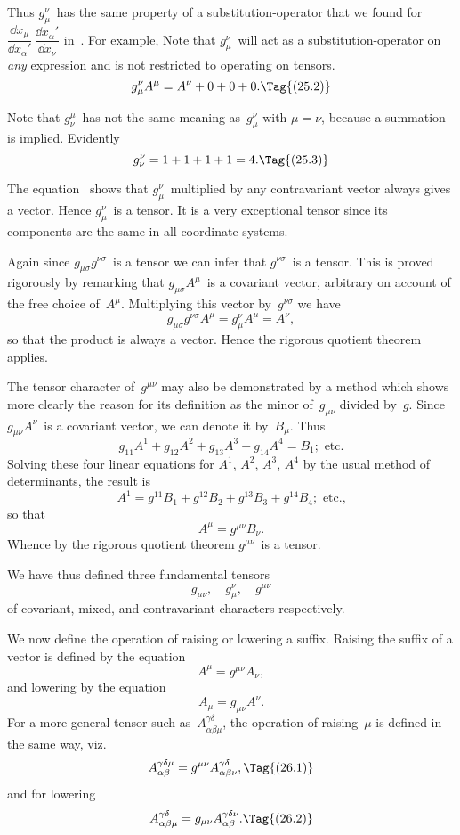 \documentclass[12pt]{book}
\begin{document}
Thus $g_{\mu}^{\nu}$~has the same property of a substitution-operator that we found
%
for $\dfrac{\dd x_{\mu}}{\dd x_{\alpha}'}\, \dfrac{\dd x_{\alpha}'}{\dd x_{\nu}}$ in~. For example\footnotemark,\footnotetext
  {Note that $g_{\mu}^{\nu}$~will act as a substitution-operator on \emph{any} expression and is not restricted to
  operating on tensors.}
\[
g_{\mu}^{\nu} A^{\mu} = A^{\nu} + 0 + 0 + 0.
\Tag{(25.2)}
\]

Note that $g_{\nu}^{\mu}$~has not the same meaning as~$g_{\mu}^{\nu}$ with $\mu = \nu$, because a
summation is implied. Evidently
\[
g_{\nu}^{\nu} = 1 + 1 + 1 +1 = 4.
\Tag{(25.3)}
\]

The equation~ shows that $g_{\mu}^{\nu}$~multiplied by any contravariant vector
always gives a vector. Hence $g_{\mu}^{\nu}$~is a tensor. It is a very exceptional tensor
since its components are the same in all coordinate-systems.

Again since $g_{\mu\sigma}g^{\nu\sigma}$~is a tensor we can infer that $g^{\nu\sigma}$~is a tensor. This is
proved rigorously by remarking that $g_{\mu\sigma} A^{\mu}$~is a covariant vector, arbitrary
on account of the free choice of~$A^{\mu}$. Multiplying this vector by~$g^{\nu\sigma}$ we have
\[
g_{\mu\sigma} g^{\nu\sigma} A^{\mu} = g_{\mu}^{\nu} A^{\mu} = A^{\nu},
\]
so that the product is always a vector. Hence the rigorous quotient theorem
applies.

The tensor character of~$g^{\mu\nu}$ may also be demonstrated by a method which
shows more clearly the reason for its definition as the minor of~$g_{\mu\nu}$ divided by~$g$.
Since $g_{\mu\nu} A^{\nu}$~is a covariant vector, we can denote it by~$B_{\mu}$. Thus
\[
g_{11} A^{1} + g_{12} A^{2} + g_{13} A^{3} + g_{14} A^{4} = B_{1}; \text{ etc.}
\]
Solving these four linear equations for $A^{1}$, $A^{2}$, $A^{3}$, $A^{4}$ by the usual method of
determinants, the result is
\[
A^{1} = g^{11} B_{1} + g^{12} B_{2} + g^{13} B_{3} + g^{14} B_{4}; \text{ etc.,}
\]
so that
\[
A^{\mu} = g^{\mu\nu} B_{\nu}.
\]
Whence by the rigorous quotient theorem $g^{\mu\nu}$~is a tensor.

We have thus defined three fundamental tensors
\[
g_{\mu\nu},\quad
g_{\mu}^{\nu},\quad
g^{\mu\nu}
\]
of covariant, mixed, and contravariant characters respectively.

%

We now define the operation of raising or lowering a suffix. Raising the
%
suffix of a vector is defined by the equation
\[
A^{\mu} = g^{\mu\nu} A_{\nu},
\]
and lowering by the equation
\[
A_{\mu} = g_{\mu\nu} A^{\nu}.
\]
For a more general tensor such as~$A_{\alpha\beta\mu}^{\gamma\delta}$, the operation of raising~$\mu$ is defined
in the same way, viz.\
\[
A_{\alpha\beta}^{\gamma\delta\mu} = g^{\mu\nu} A_{\alpha\beta\nu}^{\gamma\delta},
\Tag{(26.1)}
\]
and for lowering
\[
A_{\alpha\beta\mu}^{\gamma\delta} = g_{\mu\nu} A_{\alpha\beta}^{\gamma\delta\nu}.
\Tag{(26.2)}
\]
\end{document}
